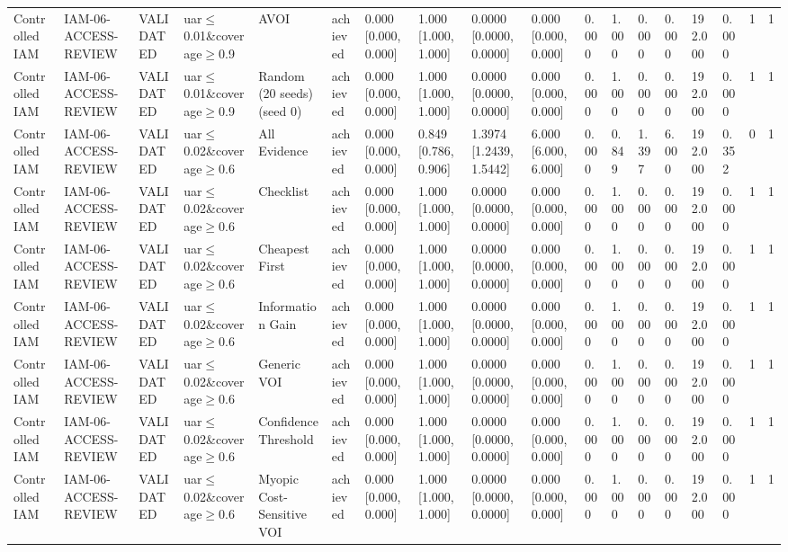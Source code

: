\begin{table}[!ht]
{\begin{tabular}{llllllllllllllllll}
Controlled IAM & IAM-06-ACCESS-REVIEW & VALIDATED & uar$\le$0.01\&coverage$\ge$0.9 & AVOI & achieved & 0.000 [0.000, 0.000] & 1.000 [1.000, 1.000] & 0.0000 [0.0000, 0.0000] & 0.000 [0.000, 0.000] & 0.000 & 1.000 & 0.000 & 0.000 & 192.000 & 0.000 & 1 & 1 \\
Controlled IAM & IAM-06-ACCESS-REVIEW & VALIDATED & uar$\le$0.01\&coverage$\ge$0.9 & Random (20 seeds) (seed 0) & achieved & 0.000 [0.000, 0.000] & 1.000 [1.000, 1.000] & 0.0000 [0.0000, 0.0000] & 0.000 [0.000, 0.000] & 0.000 & 1.000 & 0.000 & 0.000 & 192.000 & 0.000 & 1 & 1 \\
Controlled IAM & IAM-06-ACCESS-REVIEW & VALIDATED & uar$\le$0.02\&coverage$\ge$0.6 & All Evidence & achieved & 0.000 [0.000, 0.000] & 0.849 [0.786, 0.906] & 1.3974 [1.2439, 1.5442] & 6.000 [6.000, 6.000] & 0.000 & 0.849 & 1.397 & 6.000 & 192.000 & 0.352 & 0 & 1 \\
Controlled IAM & IAM-06-ACCESS-REVIEW & VALIDATED & uar$\le$0.02\&coverage$\ge$0.6 & Checklist & achieved & 0.000 [0.000, 0.000] & 1.000 [1.000, 1.000] & 0.0000 [0.0000, 0.0000] & 0.000 [0.000, 0.000] & 0.000 & 1.000 & 0.000 & 0.000 & 192.000 & 0.000 & 1 & 1 \\
Controlled IAM & IAM-06-ACCESS-REVIEW & VALIDATED & uar$\le$0.02\&coverage$\ge$0.6 & Cheapest First & achieved & 0.000 [0.000, 0.000] & 1.000 [1.000, 1.000] & 0.0000 [0.0000, 0.0000] & 0.000 [0.000, 0.000] & 0.000 & 1.000 & 0.000 & 0.000 & 192.000 & 0.000 & 1 & 1 \\
Controlled IAM & IAM-06-ACCESS-REVIEW & VALIDATED & uar$\le$0.02\&coverage$\ge$0.6 & Information Gain & achieved & 0.000 [0.000, 0.000] & 1.000 [1.000, 1.000] & 0.0000 [0.0000, 0.0000] & 0.000 [0.000, 0.000] & 0.000 & 1.000 & 0.000 & 0.000 & 192.000 & 0.000 & 1 & 1 \\
Controlled IAM & IAM-06-ACCESS-REVIEW & VALIDATED & uar$\le$0.02\&coverage$\ge$0.6 & Generic VOI & achieved & 0.000 [0.000, 0.000] & 1.000 [1.000, 1.000] & 0.0000 [0.0000, 0.0000] & 0.000 [0.000, 0.000] & 0.000 & 1.000 & 0.000 & 0.000 & 192.000 & 0.000 & 1 & 1 \\
Controlled IAM & IAM-06-ACCESS-REVIEW & VALIDATED & uar$\le$0.02\&coverage$\ge$0.6 & Confidence Threshold & achieved & 0.000 [0.000, 0.000] & 1.000 [1.000, 1.000] & 0.0000 [0.0000, 0.0000] & 0.000 [0.000, 0.000] & 0.000 & 1.000 & 0.000 & 0.000 & 192.000 & 0.000 & 1 & 1 \\
Controlled IAM & IAM-06-ACCESS-REVIEW & VALIDATED & uar$\le$0.02\&coverage$\ge$0.6 & Myopic Cost-Sensitive VOI & achieved & 0.000 [0.000, 0.000] & 1.000 [1.000, 1.000] & 0.0000 [0.0000, 0.0000] & 0.000 [0.000, 0.000] & 0.000 & 1.000 & 0.000 & 0.000 & 192.000 & 0.000 & 1 & 1 \\

\end{tabular}}
\end{table}
